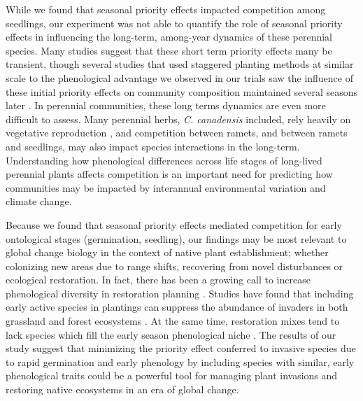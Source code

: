 \documentclass{article}[11pt]
\begin{document}
While we found that seasonal priority effects impacted competition among seedlings, our experiment was not able to quantify the role of seasonal priority effects in influencing the long-term, among-year dynamics of these perennial species. %
Many studies suggest that these short term priority effects many be transient, though several studies that used staggered planting methods at similar scale to the phenological advantage we observed in our trials saw the influence of these initial priority effects on community composition maintained several seasons later \citep{Vaughn:2015wp,Young:2017aa,Torrez:2017to}. In perennial communities, these long terms dynamics are even more difficult to assess. Many perennial herbs, \textit{C. canadensis} included, rely heavily on vegetative reproduction \citep{Hawkins:2005ve}, and competition between ramets, and between ramets and seedlings, may also impact species interactions in the long-term. %
Understanding how phenological differences across life stages of long-lived perennial plants affects competition is an important need for predicting how communities may be impacted by interannual environmental variation and climate change. %

Because we found that seasonal priority effects mediated competition for early ontological stages (germination, seedling), our findings may be most relevant to global change biology in the context of native plant establishment; whether colonizing new areas due to range shifts, recovering from novel disturbances or ecological restoration. In fact, there has been a growing call to increase phenological diversity in restoration planning \citep{Hess:2019vn}. Studies have found that including early active species in plantings can suppress the abundance of invaders in both grassland \citep{Cleland:2013wo} and forest ecosystems \citep{Schuster:2020ww}. At the same time, restoration mixes tend to lack species which fill the early season phenological niche \citep{Havens:2016vo}. The results of our study suggest that minimizing the priority effect conferred to invasive species due to rapid germination and early phenology by including species with similar, early phenological traits could be a powerful tool for managing plant invasions and restoring native ecosystems in an era of global change.
\end{document}
